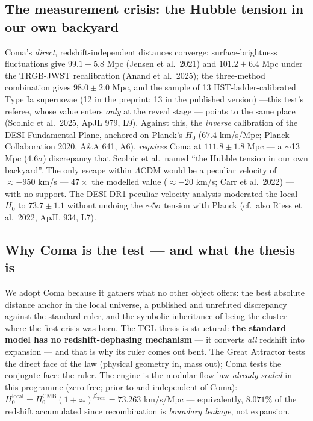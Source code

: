 \documentclass[11pt]{article}
\newcommand{\bTGL}{\beta_{\mathrm{TGL}}}\newcommand{\Msun}{M_{\odot}}\newcommand{\TGL}{\mathrm{TGL}}
\theoremstyle{definition}\newtheorem{deriv}{Derivation}
\begin{document}
\subsection*{The measurement crisis: the Hubble tension in our own backyard}

Coma's \emph{direct}, redshift-independent distances converge: surface-brightness fluctuations give $99.1\pm5.8$ Mpc (Jensen et al.\ 2021) and $101.2\pm6.4$ Mpc under the TRGB-JWST recalibration (Anand et al.\ 2025); the three-method combination gives $98.0\pm2.0$ Mpc, and the sample of 13 HST-ladder-calibrated Type Ia supernovae (12 in the preprint; 13 in the published version) ---this test's referee, whose value enters \emph{only} at the reveal stage --- points to the same place (Scolnic et al.\ 2025, ApJL 979, L9). Against this, the \emph{inverse} calibration of the DESI Fundamental Plane, anchored on Planck's $H_0$ ($67.4$ km/s/Mpc; Planck Collaboration 2020, A\&A 641, A6), \emph{requires} Coma at $111.8\pm1.8$ Mpc --- a $\sim$13 Mpc ($4.6\sigma$) discrepancy that Scolnic et al.\ named ``the Hubble tension in our own backyard''. The only escape within $\Lambda$CDM would be a peculiar velocity of $\approx-950$ km/s --- $47\times$ the modelled value ($\approx-20$ km/s; Carr et al.\ 2022) --- with no support. The DESI DR1 peculiar-velocity analysis moderated the local $H_0$ to $73.7\pm1.1$ without undoing the $\sim5\sigma$ tension with Planck (cf.\ also Riess et al.\ 2022, ApJL 934, L7).

\subsection*{Why Coma is the test --- and what the thesis is}

We adopt Coma because it gathers what no other object offers: the best absolute distance anchor in the local universe, a published and unrefuted discrepancy against the standard ruler, and the symbolic inheritance of being the cluster where the first crisis was born. The TGL thesis is structural: \textbf{the standard model has no redshift-dephasing mechanism} --- it converts \emph{all} redshift into expansion --- and that is why its ruler comes out bent. The Great Attractor tests the direct face of the law (physical geometry in, mass out); Coma tests the conjugate face: the ruler. The engine is the modular-flow law \emph{already sealed} in this programme (zero-free; prior to and independent of Coma): $H_0^{\mathrm{local}}=H_0^{\mathrm{CMB}}(1+z_*)^{\bTGL}=73.263$ km/s/Mpc --- equivalently, $8.071\%$ of the redshift accumulated since recombination is \emph{boundary leakage}, not expansion.
\end{document}
